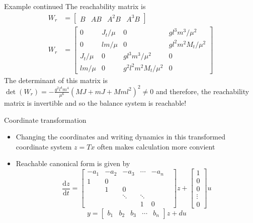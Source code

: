 \documentclass{beamer-control}
\begin{document}
\begin{frame}{Example continued}
The reachability matrix is
\begin{align*}
	W_r&= \begin{bmatrix}
		B & AB & A^2 B & A^3B
	\end{bmatrix} \\ 
	W_r &= \begin{bmatrix}
		0 & J_t/\mu & 0 & gl^3m^3/\mu^2 \\ 
		0 & lm/\mu & 0 & gl^2m^2M_t/\mu^2 \\
		J_t/\mu & 0 & gl^3m^3/\mu^2 & 0 \\
		lm/\mu & 0 & g^2l^2m^2M_t/\mu^2 & 0 
	\end{bmatrix}
\end{align*}
The determinant of this matrix is $\operatorname{det}(W_r)=-\frac{g^2l^4m^4}{\mu^6}(MJ+mJ+Mml^2)^2\neq 0$ and therefore, the reachability matrix is invertible and so the balance system is reachable!
\end{frame}


\begin{frame}{Coordinate transformation}
\begin{itemize}
	\item Changing the coordinates and writing dynamics in this transformed coordinate system $z=Tx$ often makes calculation more convient
	\item Reachable canonical form is given by 
	\[\frac{\mathrm{d}z}{\mathrm{d}t} = \begin{bmatrix}
		-a_1 & -a_2 & -a_3 &  \cdots & -a_n	\\
		1 & 0 & & & \\
		& 1& 0 & & & \\
		& & \ddots & \ddots  & \\
		& & & 1 & 0
			\end{bmatrix}z + \begin{bmatrix}
			1 \\ 0 \\ 0 \\ \vdots \\ 0
			\end{bmatrix} u \]
			\[y=\begin{bmatrix}
				b_1 & b_2 & b_3 & \cdots & b_n
			\end{bmatrix}z + du\]
\end{itemize}
\end{frame}
\end{document}
